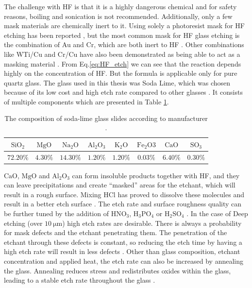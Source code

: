 \documentclass[final]{jyflluk}
\begin{document}
The challenge with HF is that it is a highly dangerous chemical and for safety reasons, boiling and sonication is not recommended. Additionally, only a few mask materials are chemically inert to it.  Using solely a photoresist mask for HF etching has been reported \cite{lin2001fast,guanglong2012microfluidic}, but the most common mask for HF glass etching is the combination of Au and Cr, which are both inert to HF \cite{iliescu2005characterization,tay2006defect}. Other combinations like WTi/Cu and Cr/Cu have also been demonstrated as being able to act as a masking material \cite{Hgglund2013CharacterizationOM,iliescu2008wet}.
From Eq.\ref{eq:HF_etch} we can see that the reaction depends highly on the concentration of HF. But the formula is applicable only for pure quartz glass. The glass used in this thesis was Soda Lime, which was chosen because of its low cost and high etch rate compared to other glasses \cite{srivannavit2004design}. It consists of multiple components which are presented in Table \ref{tab:soda_lime}. 
\begin{table}[h]
    \centering
    \caption{The composition of soda-lime glass slides according to manufacturer \cite{Soda_lime_ONLINE}.}
    \label{tab:soda_lime}
    \begin{tabular}{cccccccc} \toprule
       $\mathrm{SiO_2}$  & $\mathrm{MgO}$   &  $\mathrm{Na_2 O}$ & $\mathrm{Al_2 O_3}$ &  $\mathrm{K_2 O}$ &  $\mathrm{Fe_2O3}$ &  $\mathrm{CaO}$ & $\mathrm{SO_3}$ \\ \midrule

       $72.20 \percent$  &  $4.30 \percent$ &  $14.30 \percent$  & $1.20 \percent$     &  $1.20 \percent$  & $0.03 \percent$    & $6.40 \percent$ & $0.30 \percent$\\ \bottomrule
    \end{tabular}
\end{table} 
$\mathrm{CaO}$, $\mathrm{MgO}$ and $\mathrm{Al_2 O_3}$ can form insoluble products together with HF, and they can leave precipitations and create “masked” areas for the etchant, which will result in a rough surface. Mixing HCl has proved to dissolve these molecules and result in a better etch surface \cite{iliescu2005characterization}. The etch rate and surface roughness quality can be further tuned by the addition of $\mathrm{HNO_3}$, $\mathrm{H_3 PO_4 }$  or $\mathrm{H_2SO_4}$ \cite{park2017review}. In the case of Deep etching (over $\SI{10}{\micro \metre}$) high etch rates are desirable. There is always a probability for mask defects and the etchant penetrating them. The penetration of the etchant through these defects is constant, so reducing the etch time by having a high etch rate will result in less defects \cite{tay2006defect}. Other than glass composition, etchant concentration and applied heat, the etch rate can also be increased by annealing the glass. Annealing reduces stress and redistributes oxides within the glass, leading to a stable etch rate throughout the glass \cite{iliescu2005THOROUGH}.
\end{document}
